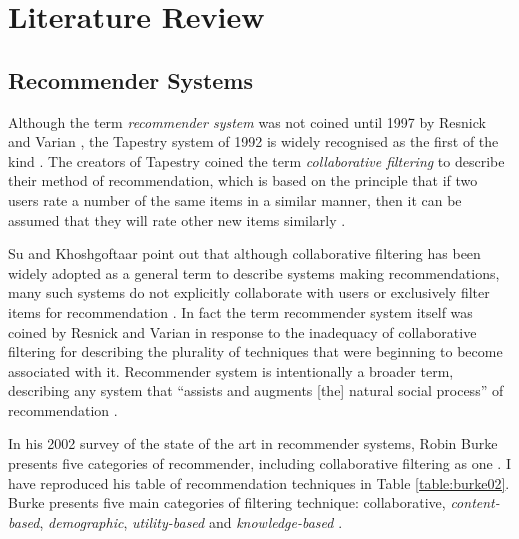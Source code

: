 \iffalse
Chapter 2: Literature Review and Context - the setting of the project in the context of other relevant work or theories or results. How this setting influenced the project.
\fi

\section{Literature Review}\label{literature review}

\subsection{Recommender Systems}

Although the term \textit{recommender system} was not coined until 1997 by Resnick and Varian \cite{Resnick97}, the Tapestry system of 1992 \cite{Goldberg92} is widely recognised as the first of the kind \cite{Su09}. The creators of Tapestry coined the term \textit{collaborative filtering} to describe their method of recommendation, which is based on the principle that if two users rate a number of the same items in a similar manner, then it can be assumed that they will rate other new items similarly \cite{Su09}.

Su and Khoshgoftaar point out that although collaborative filtering has been widely adopted as a general term to describe systems making recommendations, many such systems do not explicitly collaborate with users or exclusively filter items for recommendation \cite{Su09}. In fact the term recommender system itself was coined by Resnick and Varian in response to the inadequacy of collaborative filtering for describing the plurality of techniques that were beginning to become associated with it. Recommender system is intentionally a broader term, describing any system that ``assists and augments [the] natural social process'' of recommendation \cite{Resnick97}.

In his 2002 survey of the state of the art in recommender systems, Robin Burke presents five categories of recommender, including collaborative filtering as one \cite{Burke02}. I have reproduced his table of recommendation techniques in Table \ref{table:burke02}. Burke presents five main categories of filtering technique: collaborative, \textit{content-based}, \textit{demographic}, \textit{utility-based} and \textit{knowledge-based} \cite{Burke02}.

